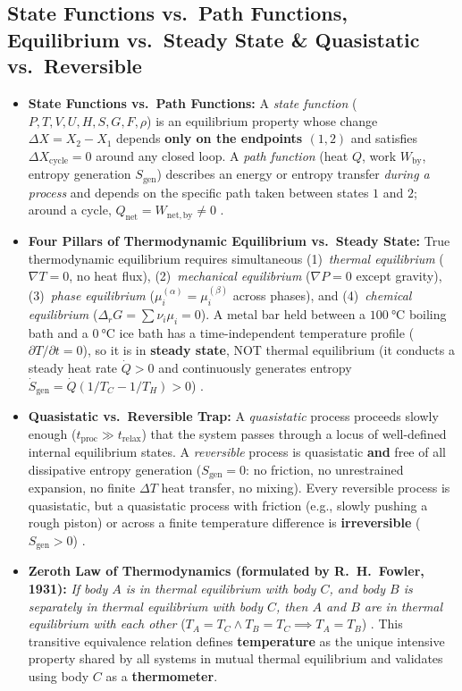 \subsection{State Functions vs.\ Path Functions, Equilibrium vs.\ Steady State \& Quasistatic vs.\ Reversible}
\begin{itemize}
  \item \textbf{State Functions vs.\ Path Functions:} A \emph{state function} ($P, T, V, U, H, S, G, F, \rho$) is an equilibrium property whose change $\Delta X = X_2 - X_1$ depends \textbf{only on the endpoints $(1, 2)$} and satisfies $\Delta X_{\mathrm{cycle}} = 0$ around any closed loop. A \emph{path function} (heat $Q$, work $W_{\mathrm{by}}$, entropy generation $S_{\mathrm{gen}}$) describes an energy or entropy transfer \emph{during a process} and depends on the specific path taken between states $1$ and $2$; around a cycle, $Q_{\mathrm{net}} = W_{\mathrm{net,by}} \neq 0$ .
  \item \textbf{Four Pillars of Thermodynamic Equilibrium vs.\ Steady State:} True thermodynamic equilibrium requires simultaneous (1)~\emph{thermal equilibrium} ($\nabla T = 0$, no heat flux), (2)~\emph{mechanical equilibrium} ($\nabla P = 0$ except gravity), (3)~\emph{phase equilibrium} ($\mu_i^{(\alpha)} = \mu_i^{(\beta)}$ across phases), and (4)~\emph{chemical equilibrium} ($\Delta_r G = \sum \nu_i \mu_i = 0$). A metal bar held between a $\SI{100}{\celsius}$ boiling bath and a $\SI{0}{\celsius}$ ice bath has a time-independent temperature profile ($\partial T/\partial t = 0$), so it is in \textbf{steady state}, NOT thermal equilibrium (it conducts a steady heat rate $\dot{Q} > 0$ and continuously generates entropy $\dot{S}_{\mathrm{gen}} = \dot{Q}(1/T_C - 1/T_H) > 0$) .
  \item \textbf{Quasistatic vs.\ Reversible Trap:} A \emph{quasistatic} process proceeds slowly enough ($t_{\mathrm{proc}} \gg t_{\mathrm{relax}}$) that the system passes through a locus of well-defined internal equilibrium states. A \emph{reversible} process is quasistatic \textbf{and} free of all dissipative entropy generation ($S_{\mathrm{gen}} = 0$: no friction, no unrestrained expansion, no finite $\Delta T$ heat transfer, no mixing). Every reversible process is quasistatic, but a quasistatic process with friction (e.g., slowly pushing a rough piston) or across a finite temperature difference is \textbf{irreversible} ($S_{\mathrm{gen}} > 0$) .
  \item \textbf{Zeroth Law of Thermodynamics (formulated by R.~H.~Fowler, 1931):} \emph{If body $A$ is in thermal equilibrium with body $C$, and body $B$ is separately in thermal equilibrium with body $C$, then $A$ and $B$ are in thermal equilibrium with each other} ($T_A = T_C \land T_B = T_C \implies T_A = T_B$) . This transitive equivalence relation defines \textbf{temperature} as the unique intensive property shared by all systems in mutual thermal equilibrium and validates using body $C$ as a \textbf{thermometer}.
\end{itemize}

